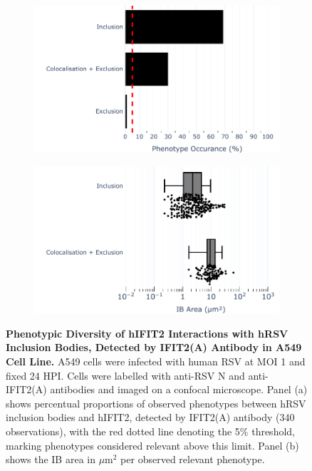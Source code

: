 \begin{figure}
    \begin{subfigure}{0.495\textwidth}
        \caption{}
        \includegraphics[width=1\linewidth]{08. Chapter 3/Figs/02. Infection/02. IFIT2/01. IFIT2A/01. bar_i2a_a549.pdf}
    \end{subfigure}
    \begin{subfigure}{0.495\textwidth}
        \caption{}
        \includegraphics[width=1\linewidth]{08. Chapter 3/Figs/02. Infection/02. IFIT2/01. IFIT2A/02. box_i2a_a549.pdf}
    \end{subfigure}
    \caption[Phenotypic Diversity of hIFIT2 Interactions with hRSV Inclusion Bodies, Detected by IFIT2(A) Antibody in A549 Cell Line.]{\textbf{Phenotypic Diversity of hIFIT2 Interactions with hRSV Inclusion Bodies, Detected by IFIT2(A) Antibody in A549 Cell Line.} A549 cells were infected with human RSV at MOI 1 and fixed 24 HPI. Cells were labelled with anti-RSV N and anti-IFIT2(A) antibodies and imaged on a confocal microscope. Panel (a) shows percentual proportions of observed phenotypes between hRSV inclusion bodies and hIFIT2, detected by IFIT2(A) antibody (340 observations), with the red dotted line denoting the 5\% threshold, marking phenotypes considered relevant above this limit. Panel (b) shows the IB area in \(\mu \mbox{m}^2\) per observed relevant phenotype.}
    \label{fig:Phenotypic Diversity of hIFIT2 Interactions with hRSV Inclusion Bodies, Detected by IFIT2(A) Antibody in A549 Cell Line}
\end{figure}

